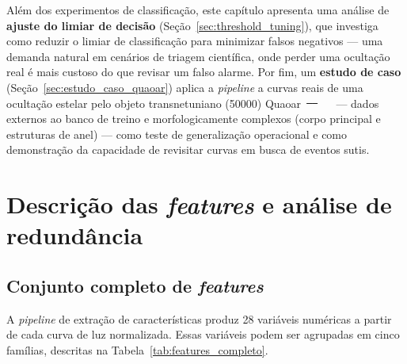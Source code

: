 \documentclass[msc]{on} %
\makeatletter
\providecommand{\DIFaddtex}[1]{{\protect\color{red}#1}} %
\providecommand{\DIFdeltex}[1]{{\protect\color{red}\sout{#1}}} %
\providecommand{\DIFaddbegin}{} %
\providecommand{\DIFaddend}{} %
\providecommand{\DIFdelbegin}{} %
\providecommand{\DIFdelend}{} %
\providecommand{\DIFadd}[1]{\texorpdfstring{\DIFaddtex{#1}}{#1}} %
\providecommand{\DIFdel}[1]{\texorpdfstring{\DIFdeltex{#1}}{}} %
\let\sout@orig\sout %
\renewcommand{\sout}[1]{\ifmmode\text{\sout@orig{\ensuremath{#1}}}\else\sout@orig{#1}\fi} %
\makeatother
\begin{document}
Além dos experimentos de classificação, este capítulo apresenta uma análise de \textbf{ajuste do limiar de decisão} (Seção~\ref{sec:threshold_tuning}), que investiga como reduzir o limiar de classificação para minimizar falsos negativos --- uma demanda natural em cenários de triagem científica, onde perder uma ocultação real é mais custoso do que revisar um falso alarme. Por fim, um \textbf{estudo de caso} (Seção~\ref{sec:estudo_caso_quaoar}) aplica a \textit{pipeline} a curvas reais de uma ocultação estelar pelo objeto transnetuniano (50000) Quaoar~\DIFdelbegin \DIFdel{\mbox{%
\citep{Quaoar2023} }\hskip0pt%
}\DIFdelend \DIFaddbegin \DIFadd{\mbox{%
\citep{Morgado2023, Quaoar2023} }\hskip0pt%
}\DIFaddend --- dados externos ao banco de treino e morfologicamente complexos (corpo principal e estruturas de anel) --- como teste de generalização operacional e como demonstração da capacidade de revisitar curvas em busca de eventos sutis.

\section{Descrição das \textit{features} e análise de redundância}
\label{sec:features_redundancia}

\subsection{Conjunto completo de \textit{features}}

A \textit{pipeline} de extração de características produz 28 variáveis numéricas a partir de cada curva de luz normalizada. Essas variáveis podem ser agrupadas em cinco famílias, descritas na Tabela~\ref{tab:features_completo}.
\end{document}
